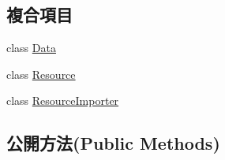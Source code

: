 \subsection*{複合項目}
\begin{DoxyCompactItemize}
\item 
class \hyperlink{class_magnum_1_1_height_field_shape3_1_1_data}{Data}
\item 
class \hyperlink{class_magnum_1_1_height_field_shape3_1_1_resource}{Resource}
\item 
class \hyperlink{class_magnum_1_1_height_field_shape3_1_1_resource_importer}{Resource\+Importer}
\end{DoxyCompactItemize}
\subsection*{公開方法(Public Methods)}
